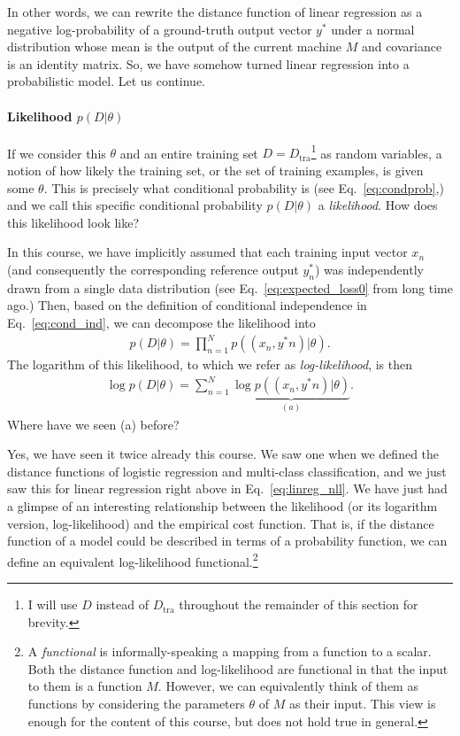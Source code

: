 \documentclass{report}
\newcommand{\tra}{\text{tra}}
\begin{document}
In other words, we can rewrite the distance function of linear regression as a
negative log-probability of a ground-truth output vector $y^*$ under a normal
distribution whose mean is the output of the current machine $M$ and covariance
is an identity matrix. So, we have somehow turned linear regression into a
probabilistic model. Let us continue.


\paragraph{Likelihood $p(D|\theta)$}

If we consider this $\theta$ and an entire training set $D=D_{\tra}$\footnote{
    I will use $D$ instead of $D_{\tra}$ throughout the remainder of this
    section for brevity.
} as random variables, a notion of how likely the training set, or the set of
training examples, is given some $\theta$. This is precisely what conditional
probability is (see Eq.~\eqref{eq:condprob},) and we call this specific
conditional probability $p(D|\theta)$ a {\it likelihood}. How does this
likelihood look like?

In this course, we have implicitly assumed that each training input vector $x_n$
(and consequently the corresponding reference output $y_n^*$) was independently
drawn from a single data distribution (see Eq.~\eqref{eq:expected_loss0} from
long time ago.) Then, based on the definition of conditional independence in
Eq.~\eqref{eq:cond_ind}, we can decompose the likelihood into
\begin{align*}
    p(D|\theta) = \prod_{n=1}^N p((x_n, y^*n)|\theta).
\end{align*}
The logarithm of this likelihood, to which we refer as {\it log-likelihood}, is
then 
\begin{align*}
    \log p(D|\theta) = \sum_{n=1}^N \underbrace{\log p((x_n,
    y^*n)|\theta)}_{(a)}.
\end{align*}
Where have we seen (a) before? 

Yes, we have seen it twice already this course. We saw one when we defined the
distance functions of logistic regression and multi-class classification, and we
just saw this for linear regression right above in Eq.~\eqref{eq:linreg_nll}.
We have just had a glimpse of an interesting relationship between the likelihood
(or its logarithm version, log-likelihood) and the empirical cost function. That
is, if the distance function of a model could be described in terms of
a probability function, we can define an equivalent log-likelihood
functional.\footnote{
    A {\it functional} is informally-speaking a mapping from a function to a
    scalar. Both the distance function and log-likelihood are functional in that
    the input to them is a function $M$. However, we can equivalently think of
    them as functions by considering the parameters $\theta$ of $M$ as their
    input. This view is enough for the content of this course, but does not hold
    true in general.
} 
\end{document}
